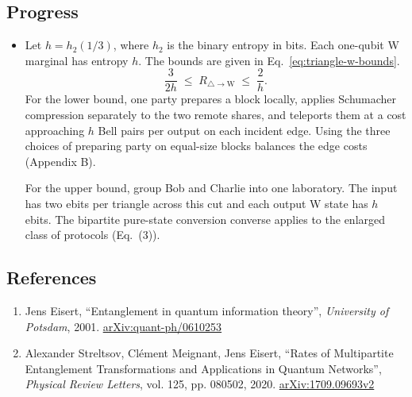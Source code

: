\subsection*{Progress}

\begin{itemize}
  \item Let $h=h_2(1/3)$, where $h_2$ is the binary entropy in bits. Each one-qubit W marginal has entropy $h$. The bounds are given in Eq.~\eqref{eq:triangle-w-bounds}.
\begin{equation}
  \frac{3}{2h}\;\leq\; R_{\triangle\to\mathrm{W}}\;\leq\;\frac{2}{h}.
  \label{eq:triangle-w-bounds}
\end{equation}
For the lower bound, one party prepares a block locally, applies Schumacher compression separately to the two remote shares, and teleports them at a cost approaching $h$ Bell pairs per output on each incident edge. Using the three choices of preparing party on equal-size blocks balances the edge costs  (Appendix B).

For the upper bound, group Bob and Charlie into one laboratory. The input has two ebits per triangle across this cut and each output W state has $h$ ebits. The bipartite pure-state conversion converse applies to the enlarged class of protocols  (Eq.~(3)).
\end{itemize}

\subsection*{References}

\begin{enumerate}[label={},leftmargin=4.8em,labelsep=0.5em]
  \footnotesize
  \item[\textup{[Eisert01]}]\label{ref:a1eea8-eisert01}
  Jens Eisert, “Entanglement in quantum information theory”, \emph{University of Potsdam}, 2001.
\href{https://arxiv.org/abs/quant-ph/0610253}{arXiv:quant-ph/0610253}

  \item[\textup{[StreltsovMeignantEisert20]}]\label{ref:a1eea8-streltsovmeignanteisert20}
  Alexander Streltsov, Cl{\'e}ment Meignant, Jens Eisert, “Rates of Multipartite Entanglement Transformations and Applications in Quantum Networks”, \emph{Physical Review Letters}, vol. 125, pp. 080502, 2020.
\href{https://arxiv.org/abs/1709.09693v2}{arXiv:1709.09693v2}
\end{enumerate}


